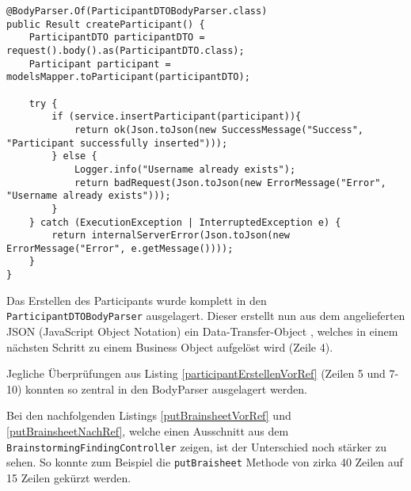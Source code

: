 \begin{lstlisting}[caption={Participant erstellen nach Refactoring}, label=participantErstellenNachRef]
@BodyParser.Of(ParticipantDTOBodyParser.class)
public Result createParticipant() {
    ParticipantDTO participantDTO = request().body().as(ParticipantDTO.class);
    Participant participant = modelsMapper.toParticipant(participantDTO);

    try {
        if (service.insertParticipant(participant)){
            return ok(Json.toJson(new SuccessMessage("Success", "Participant successfully inserted")));
        } else {
            Logger.info("Username already exists");
            return badRequest(Json.toJson(new ErrorMessage("Error", "Username already exists")));
        }
    } catch (ExecutionException | InterruptedException e) {
        return internalServerError(Json.toJson(new ErrorMessage("Error", e.getMessage())));
    }
}
\end{lstlisting}

Das Erstellen des Participants wurde komplett in den \texttt{Participant\-DTO\-Body\-Parser} ausgelagert. Dieser erstellt nun aus dem angelieferten JSON (JavaScript Object Notation) ein Data-Transfer-Object \cite{DTO}, welches in einem nächsten Schritt zu einem Business Object aufgelöst wird (Zeile 4).

Jegliche Überprüfungen aus Listing \ref{participantErstellenVorRef} (Zeilen 5 und 7-10) konnten so zentral in den BodyParser ausgelagert werden.

Bei den nachfolgenden Listings \ref{putBrainsheetVorRef} und \ref{putBrainsheetNachRef}, welche einen Ausschnitt aus dem \texttt{Brain\-storming\-Finding\-Controller} zeigen, ist der Unterschied noch stärker zu sehen. So konnte zum Beispiel die \texttt{putBraisheet} Methode von zirka 40 Zeilen auf 15 Zeilen gekürzt werden. 

